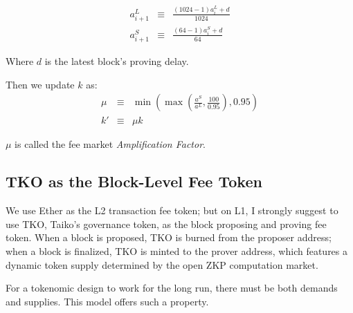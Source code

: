 \documentclass[9pt,oneside]{amsart}
\begin{document}
\begin{multicols}{2}
\begin{eqnarray}
a^L_{i+1} & \equiv & \frac{(1024-1) a^L_{i} + d}{1024} \\
a^S_{i+1} & \equiv & \frac{(64-1) a^S_{i} + d} {64}
\end{eqnarray}

Where $d$ is the latest block's proving delay.


Then we update $k$ as:
\begin{eqnarray}
\mu & \equiv & \min(\max( \frac{a^S}{a^L}, \frac{100}{0.95}), 0.95) \\
k' & \equiv  & \mu k
\end{eqnarray}

$\mu$ is called the fee market \textit{Amplification Factor}.

\subsection{TKO as the Block-Level Fee Token}

We use Ether as the L2 transaction fee token; but on L1, I strongly suggest to use TKO, Taiko's governance token,  as the block proposing and proving fee token. When a block is proposed, TKO is burned from the proposer address; when a block is finalized, TKO is minted to the prover address, which features a dynamic token supply determined by the open ZKP computation market.

For a tokenomic design to work for the long run, there must be both demands and supplies. This model offers such a property.
\end{multicols}
\end{document}
